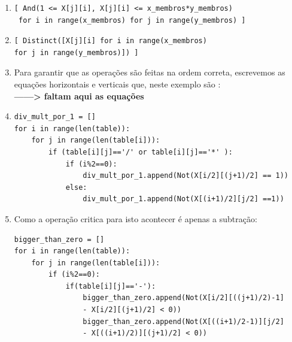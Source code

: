 \documentclass{article}
\begin{document}
 \begin{enumerate}
 \item 

\begin{verbatim}
[ And(1 <= X[j][i], X[j][i] <= x_membros*y_membros)
 for i in range(x_membros) for j in range(y_membros) ]
\end{verbatim}
 \item

\begin{verbatim}
[ Distinct([X[j][i] for i in range(x_membros)  
for j in range(y_membros)]) ]
\end{verbatim}

 \item Para garantir que as operações são feitas na ordem correta, escrevemos as equações horizontais e verticais que, neste exemplo são : \\
{\bf{------> faltam aqui as equações}}
\item 

\begin{verbatim}
div_mult_por_1 = []
for i in range(len(table)):
    for j in range(len(table[i])):
        if (table[i][j]=='/' or table[i][j]=='*' ):
            if (i%2==0):
                div_mult_por_1.append(Not(X[i/2][(j+1)/2] == 1))
            else:
                div_mult_por_1.append(Not(X[(i+1)/2][j/2] ==1))
\end{verbatim}

\item Como a operação critica para isto acontecer é apenas a subtração: 

\begin{verbatim}
bigger_than_zero = []
for i in range(len(table)):
    for j in range(len(table[i])):
        if (i%2==0):
            if(table[i][j]=='-'):
                bigger_than_zero.append(Not(X[i/2][((j+1)/2)-1] 
                - X[i/2][(j+1)/2] < 0))
                bigger_than_zero.append(Not(X[((i+1)/2-1)][j/2] 
                - X[((i+1)/2)][(j+1)/2] < 0))
\end{verbatim}


 \end{enumerate}
\end{document}
